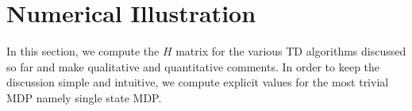 \section{Numerical Illustration}
In this section, we compute the $H$ matrix for the various TD algorithms discussed so far and make qualitative and quantitative comments. In order to keep the discussion simple and intuitive, we compute explicit values for the most trivial MDP namely single state MDP.